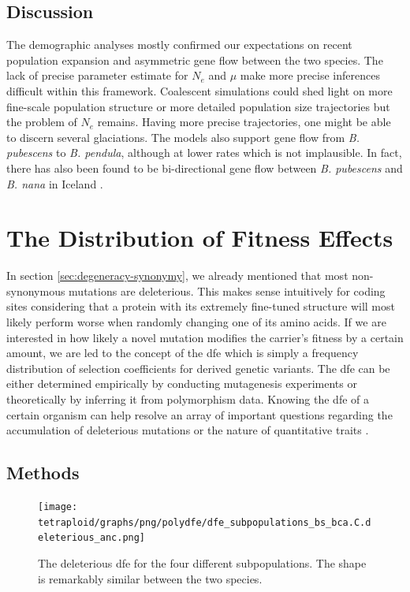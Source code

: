 \documentclass[hidelinks,11pt]{article}
\newcommand{\pendula}{\textit{B. pendula}}
\newcommand{\pubescens}{\textit{B. pubescens}}
\newcommand{\nana}{\textit{B. nana}}
\begin{document}
    \subsection{Discussion}

    The demographic analyses mostly confirmed our expectations on recent population expansion and asymmetric gene flow between the two species. The lack of precise parameter estimate for $N_e$ and $\mu$ make more precise inferences difficult within this framework. Coalescent simulations could shed light on more fine-scale population structure or more detailed population size trajectories but the problem of $N_e$ remains. Having more precise trajectories, one might be able to discern several glaciations. The models also support gene flow from \pubescens{} to \pendula{}, although at lower rates which is not implausible. In fact, there has also been found to be bi-directional gene flow between \pubescens{} and \nana{} in Iceland \cite{birch-hybridisation-nana-pubescens}.

    \clearpage


    \section{The Distribution of Fitness Effects}
    \label{sec:dfe}

    In section \ref{sec:degeneracy-synonymy}, we already mentioned that most non-synonymous mutations are deleterious. This makes sense intuitively for coding sites considering that a protein with its extremely fine-tuned structure will most likely perform worse when randomly changing one of its amino acids. If we are interested in how likely a novel mutation modifies the carrier's fitness by a certain amount, we are led to the concept of the \acrfull{dfe} which is simply a frequency distribution of selection coefficients for derived genetic variants. The \acrshort{dfe} can be either determined empirically by conducting mutagenesis experiments or theoretically by inferring it from polymorphism data. Knowing the \acrshort{dfe} of a certain organism can help resolve an array of important questions regarding the accumulation of deleterious mutations or the nature of quantitative traits \cite{dfe-review}.

    \subsection{Methods}

    \begin{figure}[ht]
        \centering
        \texttt{[image: tetraploid/graphs/png/polydfe/dfe\_subpopulations\_bs\_bca.C.deleterious\_anc.png]}
        \caption{The deleterious \acrshort{dfe} for the four different subpopulations. The shape is remarkably similar between the two species.}
        \label{fig:dfe_subpopulations_deleterious}
    \end{figure}
\end{document}
